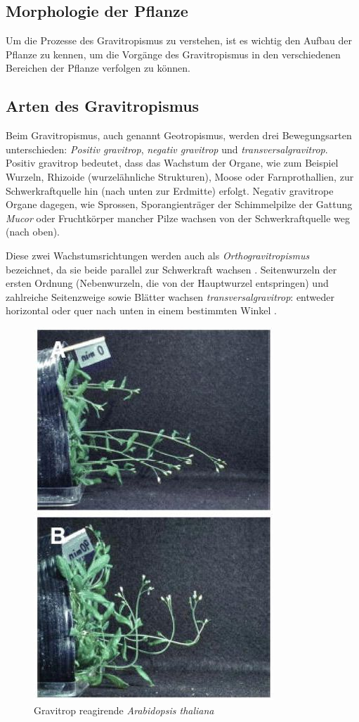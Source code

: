 \documentclass[
a4paper, 
11pt, 
ngerman,
listof=totoc,
bibliography=totocnumbered,
abstracton
]{scrreprt}
\begin{document}
\subsection{Morphologie der Pflanze}

Um die Prozesse des Gravitropismus zu verstehen, ist es wichtig den Aufbau der Pflanze zu kennen, um die Vorgänge des Gravitropismus in den verschiedenen Bereichen der Pflanze verfolgen zu können.



\subsection{Arten des Gravitropismus}

Beim Gravitropismus, auch genannt Geotropismus, werden drei Bewegungsarten unterschieden: \emph{Positiv gravitrop},  \emph{negativ gravitrop} und  \emph{transversalgravitrop}.
Positiv gravitrop bedeutet, dass das Wachstum der Organe, wie zum Beispiel Wurzeln, Rhizoide (wurzelähnliche Strukturen), Moose oder Farnprothallien, zur Schwerkraftquelle hin (nach unten zur Erdmitte) erfolgt.
Negativ gravitrope Organe dagegen, wie Sprossen, Sporangienträger der Schimmelpilze der Gattung \emph{Mucor} oder Fruchtkörper mancher Pilze wachsen von der Schwerkraftquelle weg (nach oben).

Diese zwei Wachstumsrichtungen werden auch als \emph{Orthogravitropismus} bezeichnet, da sie beide parallel zur Schwerkraft wachsen \parencite[546]{Jacob}.
Seitenwurzeln der ersten Ordnung (Nebenwurzeln, die von der Hauptwurzel entspringen) und zahlreiche Seitenzweige sowie Blätter wachsen \emph{ transversalgravitrop}: entweder horizontal oder quer nach unten in einem bestimmten Winkel \parencite[449]{Strasburger}. 

\begin{figure}[H]
\centering 
 \includegraphics[width = 0.3\linewidth]{bilder/gravitrop_reagierende_Pflanze.jpg}
 \caption{Gravitrop reagirende \emph{Arabidopsis thaliana} \label{gravitrop_reagierende_Pflanze}}
\end{figure} 
 
\end{document}
